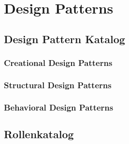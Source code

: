 \section{Design Patterns}

\subsection{Design Pattern Katalog}

\subsubsection{Creational Design Patterns}

\subsubsection{Structural Design Patterns}

\subsubsection{Behavioral Design Patterns}


\subsection{Rollenkatalog}